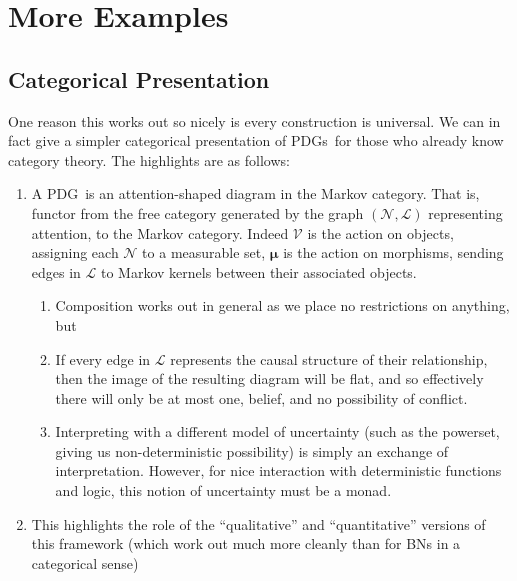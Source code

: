 \documentclass{article}
\newcommand\bmu{\boldsymbol{\mu}}
\newcommand{\MN}{PDG}
\newcommand{\MNs}{\MN s}
\begin{document}
	
	\section{More Examples}\label{sec:more-examples}
	
	\begin{example}
		\label{ex:corrob}
	\end{example}

	
	\begin{vcat}
		\section{Categorical Presentation}
		One reason this works out so nicely is every construction is universal. We can in fact give a simpler categorical presentation of \MNs\ for those who already know category theory. The highlights are as follows:
		\begin{enumerate}
			\item A \MN\ is an attention-shaped diagram in the Markov category. That is, functor from the free category generated by the graph $(\mathcal N, \mathcal L)$ representing attention, to the Markov category. Indeed $\mathcal V$ is the action on objects, assigning each $\mathcal N$ to a measurable set, $\bmu$ is the action on morphisms, sending edges in $\mathcal L$ to Markov kernels between their associated objects. 
			\begin{enumerate}
				\item Composition works out in general as we place no restrictions on anything, but
				\item If every edge in $\mathcal L$ represents the causal structure of their relationship, then the image of the resulting diagram will be flat, and so effectively there will only be at most one, belief, and no possibility of conflict.
				\item Interpreting with a different model of uncertainty (such as the powerset, giving us non-deterministic possibility) is simply an exchange of interpretation. However, for nice interaction with deterministic functions and logic, this notion of uncertainty must be a monad.
			\end{enumerate}
			
			\item This highlights the role of the ``qualitative'' and ``quantitative'' versions of this framework (which work out much more cleanly than for BNs in a categorical sense)
			

\end{enumerate}
\end{vcat}
\end{document}
